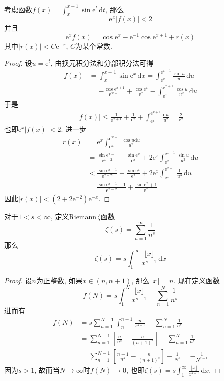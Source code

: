 \documentclass[cn,12pt,math=mtpro2,citestyle=gb7714-2015,bibstyle=gb7714-2015,twocol]{elegantbook}
\newcommand{\dx}{\,\text{d}x}
\newcommand{\dt}{\,\text{d}t}
\begin{document}
\begin{example}
考虑函数$f(x)=\int_{x}^{x+1}\sin\text{e}^t\dt$, 那么
$$\text{e}^x|f(x)|<2$$ 并且
$$\text{e}^xf(x)=\cos\text{e}^x-\text{e}^{-1}\cos\text{e}^{x+1}+r(x)$$
其中$|r(x)|<C\text{e}^{-x}$, $C$为某个常数.
\end{example}
\begin{proof}
  设$u=\text{e}^t$, 由换元积分法和分部积分法可得
  \begin{align*}
  f(x)&=\int_{x}^{x+1}\sin\text{e}^x\dx=\int_{\text{e}^x}^{\text{e}^{x+1}}\frac{\sin u}{u}\,\text{d}u \\
  &=-\frac{\cos\text{e}^{x+1}}{\text{e}^{x+1}}+\frac{\cos\text{e}^x}{\text{e}^x}-\int_{\text{e}^x}^{\text{e}^{x+1}}\frac{\cos u}{u^2}\,\text{d}u
  \end{align*}
  于是
  \begin{align*}
  |f(x)|\leq\frac{1}{\text{e}^{x+1}}+\frac{1}{\text{e}^x}+\int_{\text{e}^x}^{\text{e}^{x+1}}\frac{\text{d}u}{u^2}=\frac{2}{\text{e}^x}
  \end{align*}
  也即$\text{e}^x|f(x)|<2$. 进一步
  \begin{align*}
  r(x)&=\text{e}^x\int_{\text{e}^x}^{\text{e}^{x+1}}\frac{\cos u\text{d}u}{u^2}\\
  &=\frac{\sin\text{e}^{x+1}}{\text{e}^{x+2}}-\frac{\sin\text{e}^x}{\text{e}^x}+2\text{e}^x\int_{\text{e}^x}^{\text{e}^{x+1}}\frac{\sin u}{u^3}\,\text{d}u \\
  &<\frac{\sin\text{e}^{x+1}}{\text{e}^{x+2}}-\frac{\sin\text{e}^x}{\text{e}^x}+2\text{e}^x\int_{\text{e}^x}^{\text{e}^{x+1}}\frac{1}{u^3}\,\text{d}u \\
  &=\frac{\sin\text{e}^{x+1}-1}{\text{e}^{x+2}}+\frac{\sin\text{e}^x+1}{\text{e}^x}
  \end{align*}
  因此$|r(x)|<(2+2\text{e}^{-2})\text{e}^{-x}$.
\end{proof}

\begin{example}
对于$1<s<\infty$, 定义Riemann$\,\zeta$函数
$$\zeta(s)=\sum_{n=1}^{\infty}\frac{1}{n^s}$$
那么
$$\zeta(s)=s\int_{1}^{\infty}\frac{\lfloor x\rfloor}{x^{s+1}}\dx$$
\end{example}
\begin{proof}
  设$n$为正整数, 如果$x\in(n,n+1)$, 那么$\lfloor x\rfloor=n$. 现在定义函数
  $$f(N)=s\int_{1}^{N}\frac{\lfloor x\rfloor}{x^{s+1}}-\sum_{n=1}^{N}\frac{1}{n^s}$$
  进而有
  \begin{align*}
 f(N)&=s\sum_{n=1}^{N-1}\int_{n}^{n+1}\frac{n}{x^{s+1}}-\sum_{n=1}^{N}\frac{1}{n^s}\\
 &=\sum_{n=1}^{N-1}\left[\frac{n}{n^s}-\frac{n}{(n+1)^s}\right]-\sum_{n=1}^{N}\frac{1}{n^s}\\
 &=\sum_{n=1}^{N-1}\left[\frac{n-1}{n^s}-\frac{n}{(n+1)^s}\right]-\frac{1}{N^s}=-\frac{1}{N^{s-1}}
  \end{align*}
  因为$s>1$, 故而当$N\to\infty$时$f(N)\to0$, 也即$\displaystyle \zeta(s)=s\int_{1}^{\infty}\frac{\lfloor x\rfloor}{x^{s+1}}\dx$.
\end{proof}
\end{document}
